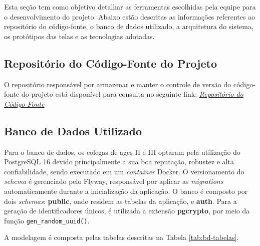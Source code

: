 Esta seção tem como objetivo detalhar as ferramentas escolhidas pela equipe para o desenvolvimento do projeto. Abaixo estão descritas as informações referentes ao repositório do código-fonte, o banco de dados utilizado, a arquitetura do sistema, os protótipos das telas e as tecnologias adotadas.

\subsection{Repositório do Código-Fonte do Projeto} 
O repositório responsável por armazenar e manter o controle de versão do código-fonte do projeto está disponível para consulta no seguinte link: 
\href{https://tools.ages.pucrs.br/salespilot}{\textit{Repositório do Código Fonte}}

\subsection{Banco de Dados Utilizado}
Para o banco de dados, os colegas de \ac{ages} II e III optaram pela utilização do PostgreSQL 16 \cite{PostgreSQL} devido principalmente a sua boa reputação, robustez e alta confiabilidade, sendo executado em um \textit{container} Docker. O versionamento do \textit{schema} é gerenciado pelo Flyway, responsável por aplicar as \textit{migrations} automaticamente durante a inicialização da aplicação. O banco é composto por dois \textit{schemas}: \textbf{public}, onde residem as tabelas da aplicação, e \textbf{auth}. Para a geração de identificadores únicos, é utilizada a extensão \textbf{pgcrypto}, por meio da função \texttt{gen\_random\_uuid()}.

A modelagem é composta pelas tabelas descritas na Tabela \ref{tab:bd-tabelas}.

